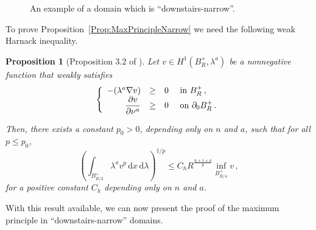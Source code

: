 \documentclass[12pt,reqno]{amsart}
\newtheorem{proposition}[theorem]{Proposition}
\theoremstyle{definition}
\theoremstyle{remark}
\renewcommand{\d}{\,\mathrm{d}} %
\newcommand{\dx}{\,\mathrm{d}x} %
\newcommand\beqc[1]{\left\{\begin{array}{#1}}
\newcommand\eeqc{\end{array} \right.}
\def\PDEsystem{rcll}
\let\div\relax
\DeclareMathOperator{\div}{div}
\numberwithin{equation}{section}
\begin{document}
\begin{figure}

\caption{An example of a domain which is ``downstairs-narrow''\!.}
\label{Fig:DownstairsNarrow}
\end{figure}


To prove Proposition~\ref{Prop:MaxPrincipleNarrow} we need the following weak Harnack inequality.

\begin{proposition}[Proposition 3.2 of \cite{TanXiong}]
\label{Prop:WeakHarnack}
Let $v \in H^1(B_R^+, \lambda^a)$ be a nonnegative function that weakly satisfies 
$$
\beqc{\PDEsystem}
-\div(\lambda^a \nabla v) &\geq& 0 & \textrm{ in } B_R^+\,, \\
\dfrac{\partial v}{\partial \nu^a} &\geq & 0 & \textrm{ on }  \partial_0 B_R^+\,.
\eeqc
$$

Then, there exists a constant $p_0 > 0$, depending only on $n$ and $a$, such that for all $p\leq p_0$,
\begin{equation}
\label{Eq:WeakHarnack}
\left( \int_{B_{R/2}^+} \lambda^a v^p \dx \d \lambda \right )^{1/p} \leq C_h R^{\frac{n+1+a}{p} } \inf_{B^+_{R/4}} v\,,
\end{equation}
for a positive constant $C_h$ depending only on $n$ and $a$.
\end{proposition}

With this result available, we can now present the proof of the maximum principle in ``downstairs-narrow'' domains.
\end{document}

